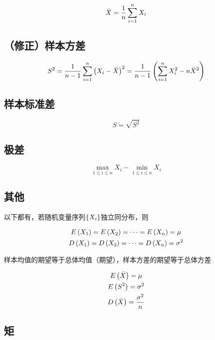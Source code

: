 \documentclass{article}
\begin{document}
\[\bar X=\frac1n\sum\limits_{i=1}^n X_i\]

\subsection{（修正）样本方差}

\[S^2=\frac1{n-1}\sum\limits_{i=1}^n{\left(X_i-\bar X\right)}^2=\frac1{n-1}\left(\sum\limits_{i=1}^n X_i^2-n\bar X^2\right)\]

\subsection{样本标准差}

\[S=\sqrt{S^2}\]

\subsection{极差}

\[\max_{1\leqslant i\leqslant n}X_i-\min_{1\leqslant i\leqslant n}X_i\]

\subsection{其他}

以下都有，若随机变量序列$\left\{X_i\right\}$独立同分布，则

\[\begin{gathered}
        E\left(X_1\right)=E\left(X_2\right)=\cdots=E\left(X_n\right)=\mu\\
        D\left(X_1\right)=D\left(X_2\right)=\cdots=D\left(X_n\right)=\sigma^2
    \end{gathered}\]

样本均值的期望等于总体均值（期望），样本方差的期望等于总体方差

\[\begin{gathered}
        E\left(\bar X\right)=\mu\\
        E\left(S^2\right)=\sigma^2\\
        D\left(\bar X\right)=\frac{\sigma^2}n
    \end{gathered}\]

\subsection{矩}
\end{document}
